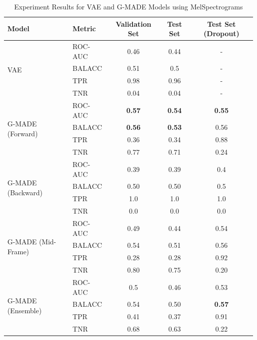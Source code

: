 \begin{table}[h!]
    \centering
    \caption{Experiment Results for VAE and G-MADE Models using MelSpectrograms}
    \begin{tabular}{|l|l|c|c|c|}
    \hline
    \textbf{Model} & \textbf{Metric} & \textbf{Validation Set} & \textbf{Test Set} & \textbf{Test Set (Dropout)} \\
    \hline
    \multirow{4}{*}{VAE} 
    & ROC-AUC & 0.46 & 0.44 & - \\
    & BALACC  & 0.51 & 0.5 & - \\
    & TPR     & 0.98 & 0.96 & - \\
    & TNR     & 0.04 & 0.04 & - \\
    \hline
    \multirow{4}{*}{G-MADE (Forward)}
    & ROC-AUC & \textbf{0.57} & \textbf{0.54} & \textbf{0.55} \\
    & BALACC  & \textbf{0.56} & \textbf{0.53} & 0.56 \\
    & TPR     & 0.36 & 0.34 & 0.88 \\
    & TNR     & 0.77 & 0.71 & 0.24 \\
    \hline
    \multirow{4}{*}{G-MADE (Backward)}
    & ROC-AUC & 0.39 & 0.39 & 0.4 \\
    & BALACC  & 0.50 & 0.50 & 0.5 \\
    & TPR     & 1.0 & 1.0 & 1.0 \\
    & TNR     & 0.0 & 0.0 & 0.0 \\
    \hline
    \multirow{4}{*}{G-MADE (Mid-Frame)}
    & ROC-AUC & 0.49 & 0.44 & 0.54 \\
    & BALACC  & 0.54 & 0.51 & 0.56 \\
    & TPR     & 0.28 & 0.28 & 0.92 \\
    & TNR     & 0.80 & 0.75 & 0.20 \\
    \hline
    \multirow{4}{*}{G-MADE (Ensemble)}
    & ROC-AUC & 0.5 & 0.46 & 0.53 \\
    & BALACC  & 0.54 & 0.50 & \textbf{0.57} \\
    & TPR     & 0.41 & 0.37 & 0.91 \\
    & TNR     & 0.68 & 0.63 & 0.22 \\
    \hline
    \end{tabular}
\end{table}

